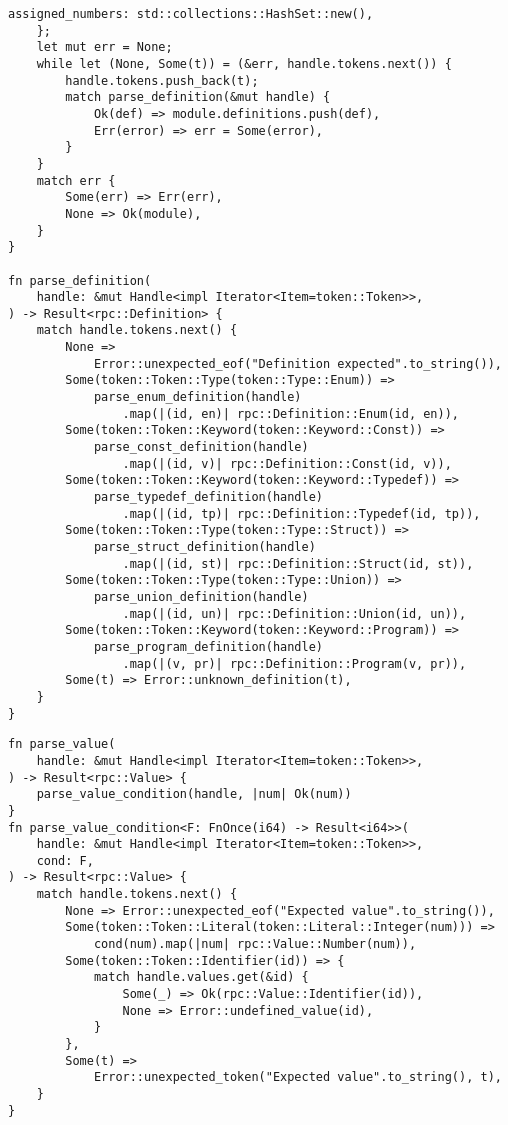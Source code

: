 \clearpage
\begin{lstlisting}[caption={Разбор определения (часть 3)}, label={lst:rust_parser_main3}]
        assigned_numbers: std::collections::HashSet::new(),
    };
    let mut err = None;
    while let (None, Some(t)) = (&err, handle.tokens.next()) {
        handle.tokens.push_back(t);
        match parse_definition(&mut handle) {
            Ok(def) => module.definitions.push(def),
            Err(error) => err = Some(error),
        }
    }
    match err {
        Some(err) => Err(err),
        None => Ok(module),
    }
}

fn parse_definition(
    handle: &mut Handle<impl Iterator<Item=token::Token>>,
) -> Result<rpc::Definition> {
    match handle.tokens.next() {
        None =>
            Error::unexpected_eof("Definition expected".to_string()),
        Some(token::Token::Type(token::Type::Enum)) =>
            parse_enum_definition(handle)
                .map(|(id, en)| rpc::Definition::Enum(id, en)),
        Some(token::Token::Keyword(token::Keyword::Const)) =>
            parse_const_definition(handle)
                .map(|(id, v)| rpc::Definition::Const(id, v)),
        Some(token::Token::Keyword(token::Keyword::Typedef)) =>
            parse_typedef_definition(handle)
                .map(|(id, tp)| rpc::Definition::Typedef(id, tp)),
        Some(token::Token::Type(token::Type::Struct)) =>
            parse_struct_definition(handle)
                .map(|(id, st)| rpc::Definition::Struct(id, st)),
        Some(token::Token::Type(token::Type::Union)) =>
            parse_union_definition(handle)
                .map(|(id, un)| rpc::Definition::Union(id, un)),
        Some(token::Token::Keyword(token::Keyword::Program)) =>
            parse_program_definition(handle)
                .map(|(v, pr)| rpc::Definition::Program(v, pr)),
        Some(t) => Error::unknown_definition(t),
    }
}
\end{lstlisting}

\clearpage

\begin{lstlisting}[caption={Разбор значения}, label={lst:rust_parser_value}]
fn parse_value(
    handle: &mut Handle<impl Iterator<Item=token::Token>>,
) -> Result<rpc::Value> {
    parse_value_condition(handle, |num| Ok(num))
}
fn parse_value_condition<F: FnOnce(i64) -> Result<i64>>(
    handle: &mut Handle<impl Iterator<Item=token::Token>>,
    cond: F,
) -> Result<rpc::Value> {
    match handle.tokens.next() {
        None => Error::unexpected_eof("Expected value".to_string()),
        Some(token::Token::Literal(token::Literal::Integer(num))) =>
            cond(num).map(|num| rpc::Value::Number(num)),
        Some(token::Token::Identifier(id)) => {
            match handle.values.get(&id) {
                Some(_) => Ok(rpc::Value::Identifier(id)),
                None => Error::undefined_value(id),
            }
        },
        Some(t) =>
            Error::unexpected_token("Expected value".to_string(), t),
    }
}
\end{lstlisting}

